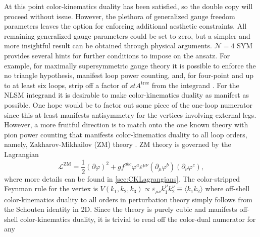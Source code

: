 \documentclass[11pt,letter]{article}
\newcommand{\atree}{\ensuremath{A^{\text{tree}}}}
\begin{document}

At this point color-kinematics duality has been satisfied, so the
double copy will proceed without issue.  However, the plethora of
generalized gauge freedom parameters leaves the option for enforcing
additional aesthetic constraints.  All remaining generalized gauge
parameters could be set to zero, but a simpler and more insightful
result can be obtained through physical arguments.  $\mathcal{N}=4$
SYM provides several hints for further conditions to impose on the
ansatz.  For example, for maximally supersymmetric gauge theory it is
possible to enforce the no triangle hypothesis, manifest loop power
counting, and, for four-point and up to at least six loops, strip off
a factor of $st \atree$ from the integrand \cite{FiveLoopN4,
  Bern:2012uf, Bern:2010fy, SuperSum, Carrasco:2021otn,
  JJHenrikReview, BRY, BDDPR, Neq44np}.  For the NLSM integrand it is
desirable to make color-kinematics duality as manifest as possible.
One hope would be to factor out some piece of the one-loop numerator
since this at least manifests antisymmetry for the vertices involving
external legs.  However, a more fruitful direction is to match onto
the one known theory with pion power counting that manifests
color-kinematics duality to all loop orders, namely,
Zakharov-Mikhailov (ZM) theory \cite{Zakharov:1973pp, Cheung:2022mix}.
ZM theory is governed by the Lagrangian
\begin{equation}
\label{eq:ZMLagrangian}
\mathcal{L}^{\text{ZM}} = \frac{1}{2}(\partial \varphi)^2
+ g f^{abc} \varphi^a \varepsilon^{\mu\nu}(\partial_\mu \varphi^b)( \partial_\nu \varphi^c),
\end{equation}
where more details can be found in \cref{sec:CKLagrangians}.  The
color-stripped Feynman rule for the vertex is
$V(k_1, k_2, k_3) \propto \varepsilon_{\mu\nu}k_1^\mu k_2^\nu \equiv \langle k_1 k_2 \rangle$ where
off-shell color-kinematics duality to all orders in perturbation
theory simply follows from the Schouten identity in 2D.  Since the theory
is purely cubic and manifests off-shell color-kinematics
duality, it is trivial to read off the color-dual numerator for any
\end{document}
